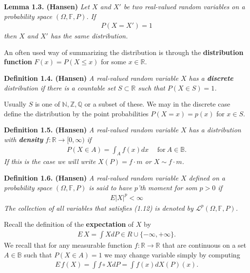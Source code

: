 \documentclass[a4paper,10pt,openany]{book}
\begin{document}
\textbf{Lemma 1.3. (Hansen)} \emph{Let \(X\) and \(X'\) be two real-valued random variables on a probability space \((\Omega,\mathbb{F},P)\). If}
\begin{align*}
    P(X=X')=1
\end{align*}
\emph{then \(X\) and \(X'\) has the same distribution.}

An often used way of summarizing the distribution is through the \textbf{distribution function} \(F(x)=P(X\le x)\) for some \(x\in\mathbb{R}\).

\textbf{Definition 1.4. (Hansen)} \emph{A real-valued random variable \(X\) has a \textbf{discrete} distribution if there is a countable set \(S\subset\mathbb{R}\) such that \(P(X\in S)=1\).}

Usually \(S\) is one of \(\mathbb{N},\mathbb{Z},\mathbb{Q}\) or a subset of these. We may in the discrete case define the distribution by the point probabilities \(P(X=x)=p(x)\) for \(x\in S\).

\textbf{Definition 1.5. (Hansen)} \emph{A real-valued random variable \(X\) has a distribution with \textbf{density} \(f : \mathbb{R}\to [0,\infty)\) if}
\begin{align*}
    P(X\in A)=\int_Af(x)dx\hspace{15pt}\text{for}\ A\in \mathbb{B}.\tag{1.5}
\end{align*}
\emph{If this is the case we will write \(X(P)=f\cdot m\) or \(X\sim f\cdot m\).}

\textbf{Definition 1.6. (Hansen)} \emph{A real-valued random variable \(X\) defined on a probability space \((\Omega, \mathbb{F},P)\) is said to have \(p\)'th moment for som \(p>0\) if}
\begin{align*}
    E\vert X\vert^p<\infty\tag{1.12}
\end{align*}
\emph{The collection of all variables that satisfies (1.12) is denoted by \(\mathcal{L}^p(\Omega,\mathbb{F},P)\).}

Recall the definition of the \textbf{expectation} of \(X\) by
\begin{align*}
    E\, X=\int XdP \in R\cup \{-\infty,+\infty\}.\tag{1.11}
\end{align*}
We recall that for any measurable function \(f : \mathbb{R}\to \mathbb{R}\) that are continuous on a set \(A\in\mathbb{B}\) such that \(P(X\in A)=1\) we may change variable simply by computing
\begin{align*}
    E\, f(X)=\int f\circ XdP=\int f(x)dX(P)(x).
\end{align*}
\end{document}
